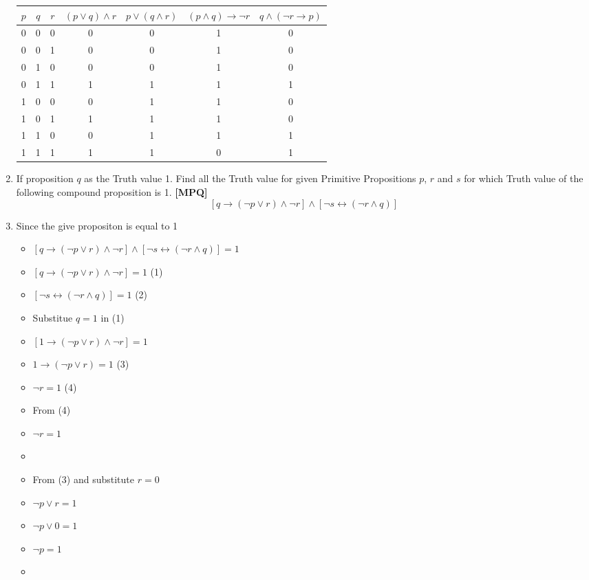 \documentclass{article}
\newcommand{\answer}{\item [$\rightarrow$]}
\begin{document}
\begin{enumerate}[label=\arabic*. ]
\begin{center}
				\begin{tabular}{|c|c|c|c|c|c|c|} \hline
					$p$ & $q$ & $r$ & $(p\lor q)\land r$ & $p\lor(q\land r)$ &
					$(p\land q)\to\neg r$ & $q\land(\neg r\to p)$ \\ \hline
					0 & 0 & 0 & 0 & 0 & 1 & 0 \\
					0 & 0 & 1 & 0 & 0 & 1 & 0 \\
					0 & 1 & 0 & 0 & 0 & 1 & 0 \\
					0 & 1 & 1 & 1 & 1 & 1 & 1 \\
					1 & 0 & 0 & 0 & 1 & 1 & 0 \\
					1 & 0 & 1 & 1 & 1 & 1 & 0 \\
					1 & 1 & 0 & 0 & 1 & 1 & 1 \\
					1 & 1 & 1 & 1 & 1 & 0 & 1 \\ \hline
				\end{tabular}
			\end{center}
		\item If proposition $q$ as the Truth value 1. Find all the Truth value for given Primitive
			Propositions
			$p$, $r$ and $s$ for which Truth value of the following compound proposition is 1.
			\textbf{[MPQ]}
			$$[q\to(\neg p\lor r)\land\neg r]\land[\neg s\leftrightarrow(\neg r\land q)]$$
		\answer Since the give propositon is equal to 1
			\begin{itemize}[label=$\Longrightarrow$ ]
				\item $[q\to(\neg p\lor r)\land\neg r]
					\land[\neg s\leftrightarrow(\neg r\land q)]=1$
				\item $[q\to(\neg p\lor r)\land\neg r]=1$ \hfill (1)
				\item $[\neg s\leftrightarrow(\neg r\land q)]=1$ \hfill (2)
				\item [] Substitue $q=1$ in (1)
				\item $[1\to(\neg p\lor r)\land\neg r]=1$
				\item $1\to(\neg p\lor r)=1$ \hfill (3)
				\item $\neg r=1$ \hfill (4)
				\item [] From (4)
				\item $\neg r=1$
				\item {}
				\item [] From (3) and substitute $r=0$
				\item $\neg p\lor r=1$
				\item $\neg p\lor 0=1$
				\item $\neg p=1$
				\item {}

\end{itemize}
\end{enumerate}
\end{document}
